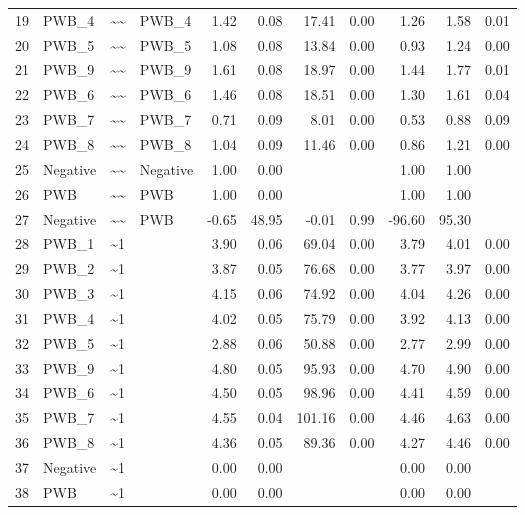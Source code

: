 \documentclass{article}
\begin{document}
\begin{table}[ht]
\begin{tabular}{rlllrrrrrrr}
  19 & PWB\_4 & \~{}\~{} & PWB\_4 & 1.42 & 0.08 & 17.41 & 0.00 & 1.26 & 1.58 & 0.01 \\ 
  20 & PWB\_5 & \~{}\~{} & PWB\_5 & 1.08 & 0.08 & 13.84 & 0.00 & 0.93 & 1.24 & 0.00 \\ 
  21 & PWB\_9 & \~{}\~{} & PWB\_9 & 1.61 & 0.08 & 18.97 & 0.00 & 1.44 & 1.77 & 0.01 \\ 
  22 & PWB\_6 & \~{}\~{} & PWB\_6 & 1.46 & 0.08 & 18.51 & 0.00 & 1.30 & 1.61 & 0.04 \\ 
  23 & PWB\_7 & \~{}\~{} & PWB\_7 & 0.71 & 0.09 & 8.01 & 0.00 & 0.53 & 0.88 & 0.09 \\ 
  24 & PWB\_8 & \~{}\~{} & PWB\_8 & 1.04 & 0.09 & 11.46 & 0.00 & 0.86 & 1.21 & 0.00 \\ 
  25 & Negative & \~{}\~{} & Negative & 1.00 & 0.00 &  &  & 1.00 & 1.00 &  \\ 
  26 & PWB & \~{}\~{} & PWB & 1.00 & 0.00 &  &  & 1.00 & 1.00 &  \\ 
  27 & Negative & \~{}\~{} & PWB & -0.65 & 48.95 & -0.01 & 0.99 & -96.60 & 95.30 &  \\ 
  28 & PWB\_1 & \~{}1 &  & 3.90 & 0.06 & 69.04 & 0.00 & 3.79 & 4.01 & 0.00 \\ 
  29 & PWB\_2 & \~{}1 &  & 3.87 & 0.05 & 76.68 & 0.00 & 3.77 & 3.97 & 0.00 \\ 
  30 & PWB\_3 & \~{}1 &  & 4.15 & 0.06 & 74.92 & 0.00 & 4.04 & 4.26 & 0.00 \\ 
  31 & PWB\_4 & \~{}1 &  & 4.02 & 0.05 & 75.79 & 0.00 & 3.92 & 4.13 & 0.00 \\ 
  32 & PWB\_5 & \~{}1 &  & 2.88 & 0.06 & 50.88 & 0.00 & 2.77 & 2.99 & 0.00 \\ 
  33 & PWB\_9 & \~{}1 &  & 4.80 & 0.05 & 95.93 & 0.00 & 4.70 & 4.90 & 0.00 \\ 
  34 & PWB\_6 & \~{}1 &  & 4.50 & 0.05 & 98.96 & 0.00 & 4.41 & 4.59 & 0.00 \\ 
  35 & PWB\_7 & \~{}1 &  & 4.55 & 0.04 & 101.16 & 0.00 & 4.46 & 4.63 & 0.00 \\ 
  36 & PWB\_8 & \~{}1 &  & 4.36 & 0.05 & 89.36 & 0.00 & 4.27 & 4.46 & 0.00 \\ 
  37 & Negative & \~{}1 &  & 0.00 & 0.00 &  &  & 0.00 & 0.00 &  \\ 
  38 & PWB & \~{}1 &  & 0.00 & 0.00 &  &  & 0.00 & 0.00 &  \\ 
   \hline
\end{tabular}
\end{table}
\end{document}
